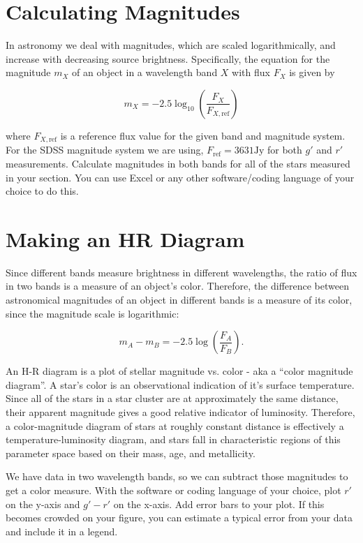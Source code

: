 \section{Calculating Magnitudes}

In astronomy we deal with magnitudes, which are scaled logarithmically, and increase with decreasing source brightness. Specifically, the equation for the magnitude $m_X$ of an object in a wavelength band $X$ with flux $F_X$ is given by 

\begin{equation}
m_{X} = -2.5\log_{10}\left(\frac{F_X}{F_{X,{\textrm{ref}}}}\right)
\end{equation}

where $F_{X,{\textrm{ref}}}$ is a reference flux value for the given band and magnitude system. For the SDSS magnitude system we are using, $F_{\textrm{ref}} = 3631 {\textrm{Jy}}$ for both $g'$ and $r'$ measurements. Calculate magnitudes in both bands for all of the stars measured in your section. You can use Excel or any other software/coding language of your choice to do this.  

\section{Making an HR Diagram}

Since different bands measure brightness in different wavelengths, the ratio of flux in two bands is a measure of an object's color. Therefore, the difference between astronomical magnitudes of an object in different bands is a measure of its color, since the magnitude scale is logarithmic:

\begin{equation}
m_A - m_B = -2.5\log\left(\frac{F_A}{F_B}\right).
\end{equation}

An H-R diagram is a plot of stellar magnitude vs. color - aka a ``color magnitude diagram''. A star's color is an observational indication of it's surface temperature. Since all of the stars in a star cluster are at approximately the same distance, their apparent magnitude gives a good relative indicator of luminosity. Therefore, a color-magnitude diagram of stars at roughly constant distance is effectively a temperature-luminosity diagram, and stars fall in characteristic regions of this parameter space based on their mass, age, and metallicity.

We have data in two wavelength bands, so we can subtract those magnitudes to get a color measure. With the software or coding language of your choice, plot $r'$ on the y-axis and $g' - r'$ on the x-axis. Add error bars to your plot. If this becomes crowded on your figure, you can estimate a typical error from your data and include it in a legend. 

